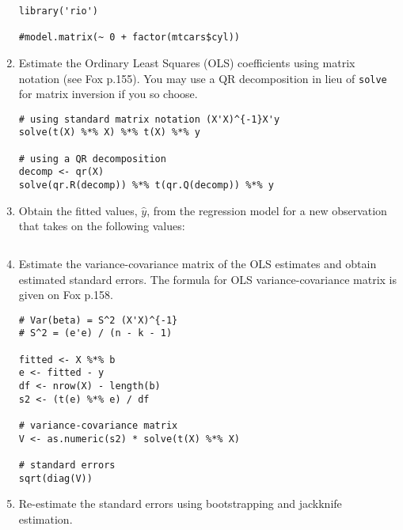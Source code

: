 \documentclass[a4paper,11pt]{article}
\begin{document}
\begin{enumerate}
\begin{solution}
\begin{lstlisting}
library('rio')

#model.matrix(~ 0 + factor(mtcars$cyl))

\end{lstlisting}
\end{solution}


\item Estimate the Ordinary Least Squares (OLS) coefficients using matrix notation (see Fox p.155). You may use a QR decomposition in lieu of \texttt{solve} for matrix inversion if you so choose.

\begin{solution}
\begin{lstlisting}
# using standard matrix notation (X'X)^{-1}X'y
solve(t(X) %*% X) %*% t(X) %*% y

# using a QR decomposition
decomp <- qr(X)
solve(qr.R(decomp)) %*% t(qr.Q(decomp)) %*% y
\end{lstlisting}
\end{solution}


\item Obtain the fitted values, $\hat{y}$, from the regression model for a new observation that takes on the following values:


\begin{solution}
\begin{lstlisting}

\end{lstlisting}
\end{solution}




\item Estimate the variance-covariance matrix of the OLS estimates and obtain estimated standard errors. The formula for OLS variance-covariance matrix is given on Fox p.158.

\begin{solution}
\begin{lstlisting}
# Var(beta) = S^2 (X'X)^{-1}
# S^2 = (e'e) / (n - k - 1)

fitted <- X %*% b
e <- fitted - y
df <- nrow(X) - length(b)
s2 <- (t(e) %*% e) / df

# variance-covariance matrix
V <- as.numeric(s2) * solve(t(X) %*% X)

# standard errors
sqrt(diag(V))
\end{lstlisting}
\end{solution}

\item Re-estimate the standard errors using bootstrapping and jackknife estimation.


\end{enumerate}
\end{document}
